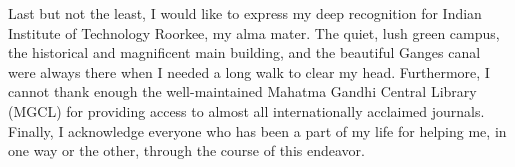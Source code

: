 \begin{acknowledgements}
Last but not the least, I would like to express my deep recognition for Indian Institute of Technology Roorkee, my alma mater. The quiet, lush green campus, the historical and magnificent main building, and the beautiful Ganges canal were always there when I needed a long walk to clear my head. Furthermore, I cannot thank enough the well-maintained Mahatma Gandhi Central Library (MGCL) for providing access to almost all internationally acclaimed journals.\\
Finally, I acknowledge everyone who has been a part of my life for helping me, in one way or the other, through the course of this endeavor.   
\end{acknowledgements}